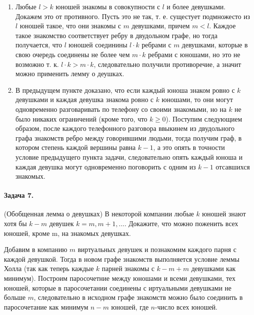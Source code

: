 \documentclass[a4paper,12pt]{article}
\begin{document}
\begin{Proof}
\begin{enumerate}
\item Любые $l>k$ юношей знакомы в совокупности с $l$ и более девушками. Докажем это от противного. Пусть это не так, т. е. сущестует подмножесто из $l$ юношей такое, что они знакомы с $m$ девушками, причем $m<l$. Каждое такое знакомство соответствует ребру в двудольном графе, но тогда получается, что $l$ юношей соединины $l \cdot k$ ребрами с $m$ девушками, которые в свою очередь соединены не более чем $m \cdot k$ ребрами с юношами, но это не возможно т. к. $l \cdot k > m \cdot k$, следовательно получили противоречие, а значит можно применить лемму о деушках.

\item В предыдущем пункте доказано, что если каждый юноша знаком ровно с $k$ девушками и каждая девушка знакома ровно с $k$ юношами, то они могут одновременно разговаривать по телефону со своими знакомыми, но на $k$ не было никаких ограничений (кроме того, что $k \ge 0$). Поступим следующием образом, после каждого телефонного разговора ввыкинем из двудольного графа знакомств ребро между говорившими людьми, тогда получим граф, в котором степень каждой вершины равна $k-1$, а это опять в точности условие предыдущего пункта задачи, следовательно опять каждый юноша и каждая девушка могут одновременно поговорить с одним из $k-1$ отсавшихся знакомых.
\end{enumerate}
\end{Proof}

\paragraph{Задача 7.} (Обобщенная лемма о девушках) В некоторой компании любые $k$ юношей знают хотя бы $k-m$ девушек $k=m,m+1,...$. Докажите, что можно поженить всех юношей, кроме m, на знакомых девушках.

\begin{Proof}
Добавим в компанию $m$ виртуальных девушек и познакомим каждого парня с каждой девушкой. Тогда в новом графе знакомств выполняется условие леммы Холла (так как теперь каждые $k$ парней знакомы с $k-m+m$ девушками как минимум). Построим паросочетние между юношами и всеми девушками, тех юношей, которые в паросочетании соединены с иртуальными девушками не больше $m$, следовательно в исходном графе знакомств можно было соединить в паросочетание как минимум $n-m$ юношей, где $n$-число всех юношей.
\end{Proof}
\end{document}
